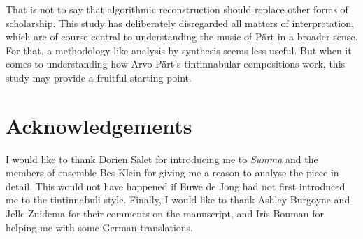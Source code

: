 \documentclass{interact}
\begin{document}
That is not to say that algorithmic reconstruction should replace other forms of scholarship.
This study has deliberately disregarded all matters of interpretation, which are of course central to understanding the music of Pärt in a broader sense.
For that, a methodology like analysis by synthesis seems less useful.
But when it comes to understanding how Arvo Pärt's tintinnabular compositions work, this study may provide a fruitful starting point.






\section*{Acknowledgements}


I would like to thank Dorien Salet for introducing me to \emph{Summa} and the members of ensemble Bes Klein for giving me a reason to analyse the piece in detail.
This would not have happened if Euwe de Jong had not first introduced me to the tintinnabuli style.
Finally, I would like to thank Ashley Burgoyne and Jelle Zuidema for their comments on the manuscript, and Iris Bouman for helping me with some German translations.









\end{document}
